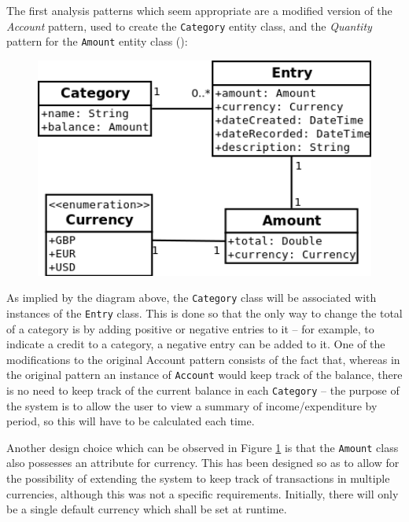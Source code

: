 The first analysis patterns which seem appropriate are a modified version of
the \emph{Account} pattern, used to create the \texttt{Category} entity class,
and the \emph{Quantity} pattern for the \texttt{Amount} entity class
(\cite[][Sections~6.1~\&~3.1]{fowler1997analysis}):
\begin{figure}[ht!]
  \begin{center}
    \includegraphics[width=12cm]{./contents/img/Class_Diagram_-_Categories_and_Amount.png}
  \end{center}
  \caption{}
  \label{fig:ClassDiagram.CategoriesAndAmount}
\end{figure}
\FloatBarrier

As implied by the diagram above, the \texttt{Category} class will be associated
with instances of the \texttt{Entry} class. This is done so that the only way to
change the total of a category is by adding positive or negative entries to it
-- for example, to indicate a credit to a category, a negative entry can be
added to it. One of the modifications to the original Account pattern consists
of the fact that, whereas in the original pattern an instance of
\texttt{Account} would keep track of the balance, there is no need to keep
track of the current balance in each \texttt{Category} -- the purpose of the
system is to allow the user to view a summary of income/expenditure by period,
so this will have to be calculated each time.

Another design choice which can be observed in Figure
\ref{fig:ClassDiagram.CategoriesAndAmount} is that the \texttt{Amount} class
also possesses an attribute for currency. This has been designed so as to allow
for the possibility of extending the system to keep track of transactions in
multiple currencies, although this was not a specific requirements. Initially,
there will only be a single default currency which shall be set at runtime.

